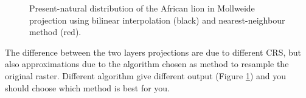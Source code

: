 \documentclass{book}
\begin{document}
\begin{figure}
\begin{minipage}[b]{0.45\linewidth}
\begin{center}
\caption{Present-natural distribution of the African lion in Mollweide projection using bilinear interpolation (black) and nearest-neighbour method (red).}
\label{fig:lion2}
\end{center}
\end{minipage}
\end{figure}


The difference between the two layers projections are due to different CRS, but also approximations due to the algorithm chosen as method to resample the original raster. Different algorithm give different output (Figure \ref{fig:lion2}) and you should choose which method is best for you.
\end{document}
